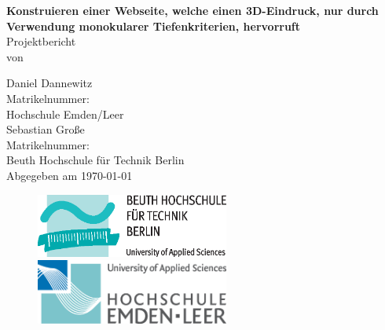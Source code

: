 \thispagestyle{plain}
\begin{titlepage}
\begin{center}
\LARGE{\textbf{Konstruieren einer Webseite, welche einen 3D-Eindruck, nur durch Verwendung monokularer Tiefenkriterien, hervorruft}}\\[6ex]
\Large
Projektbericht\\von\\[3ex]
\large

Daniel Dannewitz\\[0.5ex]
Matrikelnummer: \\[0.5ex]
Hochschule Emden/Leer\\[3ex]

Sebastian Große\\[0.5ex]
Matrikelnummer: \\[0.5ex]
Beuth Hochschule für Technik Berlin\\[6ex]

Abgegeben am \today{}

\vfill

\begin{figure}[b]
\includegraphics[width=180pt]{Logo_Beuth}
\hfill
\includegraphics[width=180pt]{Logo_Emden-Leer}
\end{figure}

\end{center}
\end{titlepage}
\restoregeometry